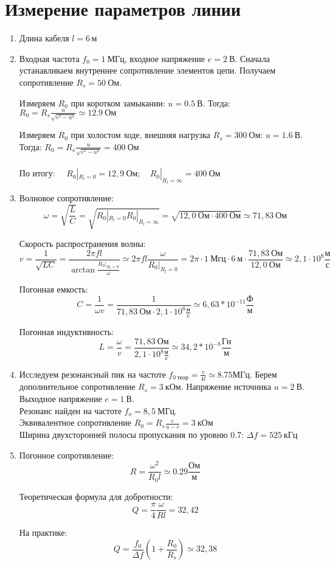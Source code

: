 
\newcommand\dboxed[1]{\dbox{\ensuremath{#1}}} %





\newpage



\section{Измерение параметров линии}

\begin{enumerate}
\item	
Длина кабеля $l = 6 \, м$
\item
Входная частота $f_0 = 1\ МГц$, входное напряжение $e = 2\ В$. Сначала устанавливаем внутреннее сопротивление элементов цепи. Получаем сопротивление $R_s = 50\ Ом$.

Измеряем $R_0$ при коротком замыкании: $u = 0.5\ В$. Тогда: $R_0 = R_s \frac{u}{\sqrt{e^2 - u^2}} \simeq 12.9\ Ом$

Измеряем $R_0$ при холостом ходе, внешняя нагрузка $R_s = 300\ Ом$: $u = 1.6\ В$. Тогда: $R_0 = R_s \frac{u}{\sqrt{e^2 - u^2}} = 400\ Ом$\\
\ \\
По итогу: $\quad R_0|_{R_l=0} = 12,9 \ Ом; \quad R_0|_{R_l=\infty} = 400 \ Ом$
\item 	
Волновое сопротивление:
$$
\omega = \sqrt{\frac{L}{C}} = \sqrt{R_0|_{R_l=0} R_0|_{R_l=\infty}} = \sqrt{12,0 \ Ом \cdot 400 \ Ом} \simeq 71,83\ Ом
$$

Скорость распространения волны:
$$
v = \frac{1}{\sqrt{LC}} = \frac{2 \pi fl}{\arctan{\frac{R_0|_{R_l=0}}{\omega}}} \simeq 2 \pi fl \frac{\omega}{R_0|_{R_l=0}} =2 \pi  \cdot 1  \ Мгц \cdot 6 \ м \cdot \frac{71,83 \ Ом}{12,0 \ Ом} \simeq 2,1 \cdot 10^8 \frac{м}{с}
$$

Погонная емкость:
$$
C = \frac{1}{\omega v} = \frac{1}{71,83 \ Ом \cdot 2,1 \cdot 10^8 \frac{м}{с}} \simeq 6,63 * 10^{-11} \frac{Ф}{м}
$$

Погонная индуктивность:
$$
L = \frac{\omega}{v} = \frac{71,83 \ Ом}{2,1 \cdot 10^8 \frac{м}{с}} \simeq 34,2 * 10^{-8} \frac{Гн}{м}
$$

\item
	Исследуем резонансный пик на частоте $f_{0 \ теор} = \frac{v}{4l} \simeq 8.75 МГц$. Берем дополнительное сопротивление $R_s = 3\ кОм$. Напряжение источника $u = 2\ В$. Выходное напряжение $e = 1\ В$.\\
	 Резонанс найден на частоте $f_o = 8,5 \ МГц$. \\
	 Эквивалентное сопротивление $R_0 = R_s \frac{e}{u - e} = 3\ кОм$\\
	 Ширина двухсторонней полосы пропускания по уровню 0.7: $\Delta f = 525 \ кГц$
\item
	Погонное сопротивление:
$$
R = \frac{\omega^2}{R_0l} \simeq 0.29 \frac{Ом}{м}
$$

Теоретическая формула для добротности:
$$
Q = \frac{\pi}{4} \frac{\omega}{Rl} = 32,42
$$

На практике:
$$
Q = \frac{f_0}{\Delta f} (1 + \frac{R_0}{R_s})	\simeq 32,38
$$
\end{enumerate}
\newpage
